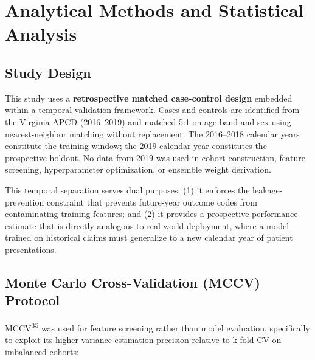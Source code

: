 \documentclass[
  12pt,
]{book}
\begin{document}
\section{Analytical Methods and Statistical
Analysis}\label{sec-analytical}

\subsection{Study Design}\label{study-design}

This study uses a \textbf{retrospective matched case-control design}
embedded within a temporal validation framework. Cases and controls are
identified from the Virginia APCD (2016--2019) and matched 5:1 on age
band and sex using nearest-neighbor matching without replacement. The
2016--2018 calendar years constitute the training window; the 2019
calendar year constitutes the prospective holdout. No data from 2019 was
used in cohort construction, feature screening, hyperparameter
optimization, or ensemble weight derivation.

This temporal separation serves dual purposes: (1) it enforces the
leakage-prevention constraint that prevents future-year outcome codes
from contaminating training features; and (2) it provides a prospective
performance estimate that is directly analogous to real-world
deployment, where a model trained on historical claims must generalize
to a new calendar year of patient presentations.

\subsection{Monte Carlo Cross-Validation (MCCV)
Protocol}\label{monte-carlo-cross-validation-mccv-protocol}

MCCV\textsuperscript{35} was used for feature screening rather than
model evaluation, specifically to exploit its higher variance-estimation
precision relative to k-fold CV on imbalanced cohorts:
\end{document}
